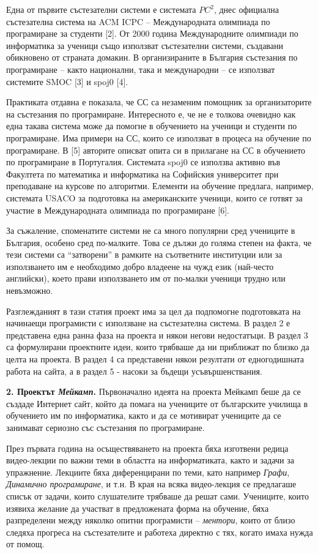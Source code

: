 \documentclass[11pt]{article}
\begin{document}
Една от първите състезателни системи е системата $PC^2$, днес
официална състезателна система на ACM ICPC -- Международната
олимпиада по програмиране за студенти [2]. От 2000 година
Международните олимпиади по информатика за ученици също използват
състезателни системи, създавани обикновено от страната домакин. В
организираните в България състезания по програмиране -- както
национални, така и международни -- се използват системите SMOC [3] и
spoj0 [4].

Практиката отдавна е показала, че СС са незаменим помощник за
организаторите на състезания по програмиране. Интересното е, че не е
толкова очевидно как една такава система може да помогне в
обучението на ученици и студенти по програмиране. Има примери на СС,
които се използват в процеса на обучение по програмиране. В [5]
авторите описват опита си в прилагане на СС в обучението по
програмиране в Португалия. Системата spoj0 се използва активно във
Факултета по математика и информатика на Софийския университет при
преподаване на курсове по алгоритми. Елементи на обучение предлага,
например, системата USACO за подготовка на американските ученици,
които се готвят за участие в Международната олимпиада по
програмиране [6].

За съжаление, споменатите системи не са много популярни сред
учениците в България, особено сред по-малките. Това се дължи до
голяма степен на факта, че тези системи са ``затворени'' в рамките
на съответните институции или за използването им е необходимо добро
владеене на чужд език (най-често английски), което прави
използването им от по-малки ученици трудно или невъзможно.

Разглежданият в тази статия проект има за цел да подпомогне
подготовката на начинаещи програмисти с използване на състезателна
система. В раздел 2 е представена една ранна фаза на проекта и някои
негови недостатъци. В раздел 3 са формулирани проектните идеи, които
трябваше да ни приближат по близко да целта на проекта. В раздел 4
са представени някои резултати от едногодишната работа на сайта, а в
раздел 5 - насоки за бъдещи усъвършенствания.

\textbf{2. Проектът \textit{Мейкамп}.} Първоначално идеята на
проекта Мейкамп беше да се създаде Интернет сайт, който да помага на
учениците от българските училища в обучението им по информатика,
както и да се мотивират учениците да се занимават сериозно със
състезания по програмиране.

През първата година на осъществяването на проекта бяха изготвени
редица видео-лекции по важни теми в областта на информатиката, както
и задачи за упражнение. Лекциите бяха диференцирани по теми, като
например \textit{Графи}, \textit{Динамично програмиране}, и т.н. В
края на всяка видео-лекция се предлагаше списък от задачи, които
слушателите трябваше да решат сами. Учениците, които изявиха желание
да участват в предложената форма на обучение, бяха разпределени
между няколко опитни програмисти -- \textit{ментори}, които от близо
следяха прогреса на състезателите и работеха директно с тях, когато
имаха нужда от помощ.
\end{document}
